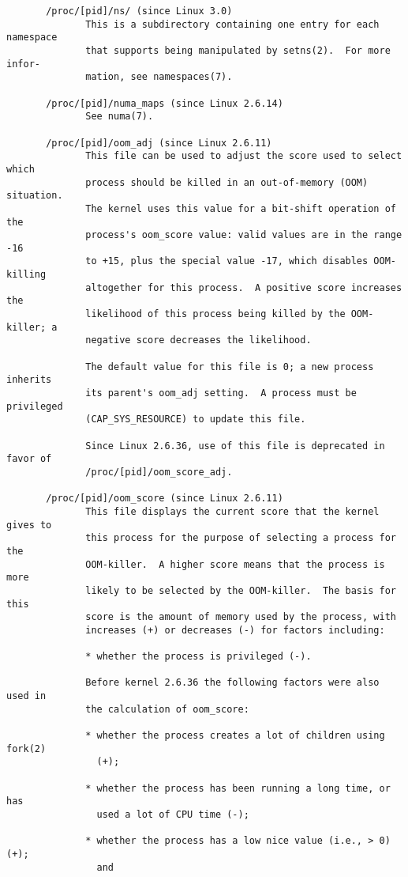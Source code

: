 \documentclass[]{article}
\begin{document}
\begin{verbatim}
       /proc/[pid]/ns/ (since Linux 3.0)
              This is a subdirectory containing one entry for each namespace
              that supports being manipulated by setns(2).  For more infor‐
              mation, see namespaces(7).

       /proc/[pid]/numa_maps (since Linux 2.6.14)
              See numa(7).

       /proc/[pid]/oom_adj (since Linux 2.6.11)
              This file can be used to adjust the score used to select which
              process should be killed in an out-of-memory (OOM) situation.
              The kernel uses this value for a bit-shift operation of the
              process's oom_score value: valid values are in the range -16
              to +15, plus the special value -17, which disables OOM-killing
              altogether for this process.  A positive score increases the
              likelihood of this process being killed by the OOM-killer; a
              negative score decreases the likelihood.

              The default value for this file is 0; a new process inherits
              its parent's oom_adj setting.  A process must be privileged
              (CAP_SYS_RESOURCE) to update this file.

              Since Linux 2.6.36, use of this file is deprecated in favor of
              /proc/[pid]/oom_score_adj.

       /proc/[pid]/oom_score (since Linux 2.6.11)
              This file displays the current score that the kernel gives to
              this process for the purpose of selecting a process for the
              OOM-killer.  A higher score means that the process is more
              likely to be selected by the OOM-killer.  The basis for this
              score is the amount of memory used by the process, with
              increases (+) or decreases (-) for factors including:

              * whether the process is privileged (-).

              Before kernel 2.6.36 the following factors were also used in
              the calculation of oom_score:

              * whether the process creates a lot of children using fork(2)
                (+);

              * whether the process has been running a long time, or has
                used a lot of CPU time (-);

              * whether the process has a low nice value (i.e., > 0) (+);
                and


\end{verbatim}
\end{document}
